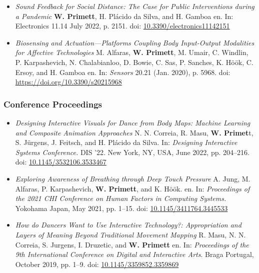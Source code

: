 \begin{itemize}
    \item[] \textit{Sound Feedback for Social Distance: The Case for Public Interventions during a Pandemic}
    \textbf{W. Primett}, H. Plácido da Silva, and H. Gamboa
    en. In: Electronics 11.14 July 2022, p. 2151. doi:
    \url{10.3390/electronics11142151}

    \item[] \textit{Biosensing and Actuation—Platforms Coupling Body Input-Output Modalities for Affective Technologies}
    M. Alfaras, \textbf{W. Primett}, M. Umair, C. Windlin, P. Karpashevich, N. Chalabianloo, D. Bowie, C. Sas, P. Sanches, K. Höök, C. Ersoy, and H. Gamboa
    en. In: \textit{Sensors} 20.21 (Jan. 2020), p. 5968. doi: \url{https://doi.org/10.3390/s20215968}
\end{itemize}

\subsubsection{Conference Proceedings}
\begin{itemize}
    \item[] \textit{Designing Interactive Visuals for Dance from Body Maps: Machine Learning and
    Composite Animation Approaches}
    N. N. Correia, R. Masu, \textbf{W. Primet}t, S. Jürgens, J. Feitsch, and H. Plácido da Silva.
    In: \textit{Designing Interactive Systems Conference.}
    DIS ’22. New York, NY, USA, June 2022, pp. 204–216. doi: \url{10.1145/3532106.3533467}

    \item[] \textit{Exploring Awareness of Breathing through Deep Touch Pressure}
    A. Jung, M. Alfaras, P. Karpashevich, \textbf{W. Primett}, and K. Höök.
    en. In: \textit{Proceedings of the 2021 CHI Conference on Human Factors in Computing Systems.} Yokohama Japan, May 2021,
    pp. 1–15. doi: \url{10.1145/3411764.3445533}

    \item[] \textit{How do Dancers Want to Use Interactive Technology?: Appropriation and Layers of Meaning Beyond Traditional Movement Mapping}
    R. Masu, N. N. Correia, S. Jurgens, I. Druzetic, and \textbf{W. Primett}
    en. In: \textit{Proceedings of the 9th International Conference on Digital and Interactive Arts}. Braga Portugal, October 2019, pp. 1–9. doi: \url{10.1145/3359852.3359869}
\end{itemize}

